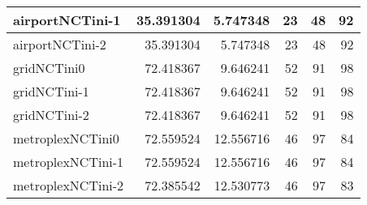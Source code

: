 \begin{longtable}{|l|r|r|r|r|r|}
airportNCTini-1 & 35.391304 & 5.747348 & 23 & 48 & 92 \\ \hline
airportNCTini-2 & 35.391304 & 5.747348 & 23 & 48 & 92 \\ \hline
gridNCTini0 & 72.418367 & 9.646241 & 52 & 91 & 98 \\ \hline
gridNCTini-1 & 72.418367 & 9.646241 & 52 & 91 & 98 \\ \hline
gridNCTini-2 & 72.418367 & 9.646241 & 52 & 91 & 98 \\ \hline
metroplexNCTini0 & 72.559524 & 12.556716 & 46 & 97 & 84 \\ \hline
metroplexNCTini-1 & 72.559524 & 12.556716 & 46 & 97 & 84 \\ \hline
metroplexNCTini-2 & 72.385542 & 12.530773 & 46 & 97 & 83 \\ \hline
\end{longtable}
\ifshowtableLinear
